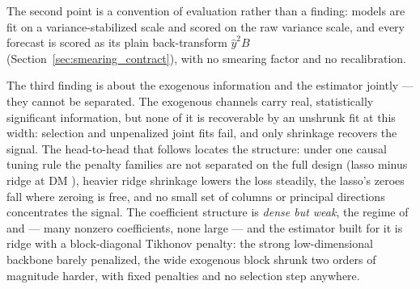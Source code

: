 The second point is a convention of evaluation rather than a finding: models
are fit on a variance-stabilized scale and scored on the raw variance scale,
and every forecast is scored as its plain back-transform $\hat y^{2}B$
(Section~\ref{sec:smearing_contract}), with no smearing factor and no
recalibration.

The third finding is about the exogenous information and the estimator
jointly --- they cannot be separated. The exogenous channels carry
real, statistically significant information, but none of it is
recoverable by an unshrunk fit at this width: selection and unpenalized
joint fits fail, and only shrinkage recovers the signal. The head-to-head that
follows locates the structure: under one causal tuning rule the penalty
families are not separated on the full design (lasso minus ridge
\unifIncrBTwoLassoTunedDQ{} at DM \unifIncrBTwoLassoTunedDM{}), heavier ridge
shrinkage lowers the loss steadily, the lasso's zeroes fall where zeroing is
free, and no small set of columns or principal directions concentrates the
signal. The
coefficient structure is \emph{dense but weak}, the regime of
\citet{GiannoneLenzaPrimiceri2021} and \citet{ShenXiu2025} --- many nonzero
coefficients, none large --- and the estimator built for it is ridge
with a block-diagonal Tikhonov penalty: the
strong low-dimensional backbone barely penalized, the wide exogenous
block shrunk two orders of magnitude harder, with fixed penalties and
no selection step anywhere.

